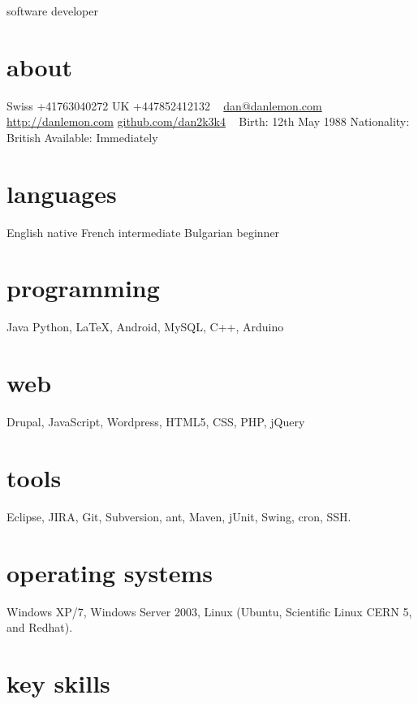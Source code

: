 \documentclass[]{friggeri-cv}
\begin{document}
       {software developer}


\begin{aside}
  \section{about}
    Swiss +41763040272
    UK +447852412132
    ~
    \href{mailto:dan@danlemon.com}{dan@danlemon.com}
    \href{http://danlemon.com}{http://danlemon.com}
    \href{http://github.com/dan2k3k4}{github.com/dan2k3k4}
    ~
    Birth: 12th May 1988
    Nationality: British
    Available: Immediately    
  \section{languages}
    English native
    French intermediate
    Bulgarian beginner
  \section{programming}
  Java
    Python, \LaTeX, Android, MySQL, C++, Arduino
  \section{web}
    Drupal, JavaScript, Wordpress, HTML5, CSS, PHP, jQuery
  \section{tools}
    Eclipse, JIRA, Git, Subversion, ant, Maven, jUnit, Swing, cron, SSH.
  \section{operating systems}
    Windows XP/7, Windows Server 2003, Linux (Ubuntu, Scientific Linux CERN 5, and Redhat).
\end{aside}



\section{key skills}
\end{document}
